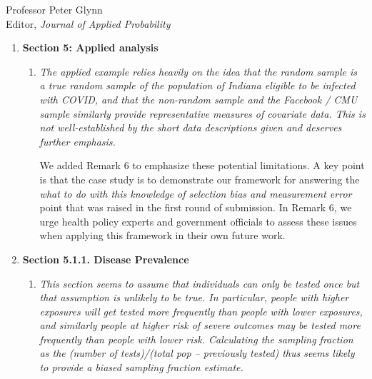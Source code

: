 \documentclass[11pt]{letter} %
\begin{document}
\begin{letter}{Professor
	Peter Glynn\\
	Editor, {\em Journal of Applied Probability}}
\begin{enumerate}
\begin{enumerate}
	We clarify this notation in Section 4.3.  Specifically, the SEIR model is used to generate the number of new weekly cases which allows us to calculate the number of individuals with an active infection within each strata (i.e.~$I_{k,t}$ for the $k$th strata).  We then can use this to calculate the posterior mean for the active infection rate per strata,~$\mu_k$.
	\vspace{5mm}
\end{enumerate}
\item {\bf Section 5: Applied analysis}
\begin{enumerate}
	\item {\it The applied example relies heavily on the idea that the random sample is a true random sample of the population of Indiana eligible to be infected with COVID, and that the non-random sample and the Facebook / CMU sample similarly provide representative measures of covariate data. This is not well-established by the short data descriptions given and deserves further emphasis.}
	\vspace{5mm}

	We added Remark 6 to emphasize these potential limitations. A key point is that the case study is to demonstrate our framework for answering the \emph{what to do with this knowledge of selection bias and measurement error} point that was raised in the first round of submission.  In Remark 6, we urge health policy experts and government officials to assess these issues when applying this framework in their own future work.
	\vspace{5mm}
\end{enumerate}
\item {\bf Section 5.1.1. Disease Prevalence}
\begin{enumerate}
	\item {\it This section seems to assume that individuals can only be tested once but that assumption is unlikely to be true. In particular, people with higher exposures will get tested more frequently than people with lower exposures, and similarly people at higher risk of severe outcomes may be tested more frequently than people with lower risk. Calculating the sampling fraction as the (number of tests)/(total pop – previously tested) thus seems likely to provide a biased sampling fraction estimate.}
	\vspace{5mm}


\end{enumerate}
\end{enumerate}
\end{letter}
\end{document}
